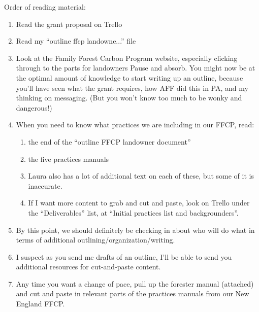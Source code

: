 \documentclass{article}\usepackage[]{graphicx}\usepackage[]{color}
\begin{document}
Order of reading material:
\begin{enumerate}
\item Read the grant proposal on Trello
\item Read my ``outline ffcp landowne...'' file
\item Look at the Family Forest Carbon Program website, especially clicking through to the parts for landowners
Pause and absorb. You might now be at the optimal amount of knowledge to start writing up an outline, because you'll have seen what the grant requires, how AFF did this in PA, and my thinking on messaging. (But you won't know too much to be wonky and dangerous!)
\item When you need to know what practices we are including in our FFCP, read:
  \begin{enumerate}
  \item the end of the ``outline FFCP landowner document''
  \item the five practices manuals
  \item Laura also has a lot of additional text on each of these, but some of it is inaccurate. 
  \item If I want more content to grab and cut and paste, look on Trello under the ``Deliverables'' list, at ``Initial practices list and backgrounders''.
  \end{enumerate}
\item By this point, we should definitely be checking in about who will do what in terms of additional outlining/organization/writing. 
\item I suspect as you send me drafts of an outline, I'll be able to send you additional resources for cut-and-paste content.
\item Any time you want a change of pace, pull up the forester manual (attached) and cut and paste in relevant parts of the practices manuals from our New England FFCP.
\end{enumerate}

  
  
\end{document}
